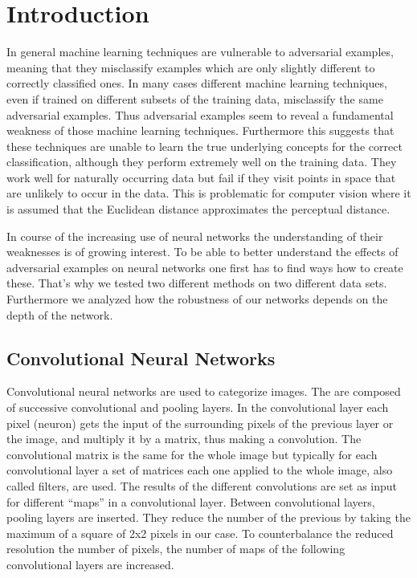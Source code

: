 \documentclass[%
 reprint,
 amsmath,amssymb,
 aps,
]{revtex4-1}
\begin{document}

\section{Introduction}

In general machine learning techniques are vulnerable to adversarial examples, meaning that they misclassify examples which are only slightly different to correctly classified ones. In many cases different machine learning techniques, even if trained on different subsets of the training data, misclassify the same adversarial examples. Thus adversarial examples seem to reveal a fundamental weakness of those machine learning techniques. Furthermore this suggests that these techniques are unable to learn the true underlying concepts for the correct classification, although they perform extremely well on the training data. They work well for naturally occurring data but fail if they visit points in space that are unlikely to occur in the data. This is problematic for computer vision where it is assumed that the Euclidean distance approximates the perceptual distance.

In course of the increasing use of neural networks the understanding of their weaknesses is of growing interest. To be able to better understand the effects of adversarial examples on neural networks one first has to find ways how to create these. That's why we tested two different methods on two different data sets. Furthermore we analyzed how the robustness of our networks depends on the depth of the network.

\subsection{Convolutional Neural Networks}

Convolutional neural networks are used to categorize images. The are composed of successive convolutional and pooling layers. In the convolutional layer each pixel (neuron) gets the input of the surrounding pixels of the previous layer or the image, and multiply it by a matrix, thus making a convolution. The convolutional matrix is the same for the whole image but typically for each convolutional layer a set of matrices each one applied to the whole image, also called filters, are used. The results of the different convolutions are set as input for different ``maps'' in a convolutional layer. Between convolutional layers, pooling layers are inserted. They reduce the number of the previous by taking the maximum of a square of 2x2 pixels in our case. To counterbalance the reduced resolution the number of pixels, the number of maps of the following convolutional layers are increased.
\end{document}
